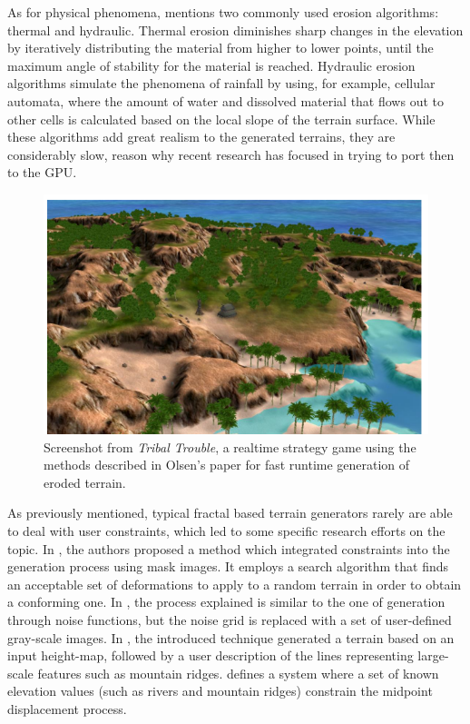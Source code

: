 \documentclass{acmtog}
\begin{document}
As for physical phenomena, \cite{Olsen04} mentions two commonly used erosion algorithms: thermal and hydraulic. Thermal erosion diminishes sharp changes in the elevation by iteratively distributing the material from higher to lower points, until the maximum angle of stability for the material is reached. Hydraulic erosion algorithms simulate the phenomena of rainfall by using, for example, cellular automata, where the amount of water and dissolved material that flows out to other cells is calculated based on the local slope of the terrain surface. While these algorithms add great realism to the generated terrains, they are considerably slow, reason why recent research has focused in trying to port then to the GPU.

\begin{figure}[!htp]
	\begin{center}
		\includegraphics[width=\columnwidth]{images/erosion.png}
	\end{center}
	\caption{Screenshot from \textit{Tribal Trouble}, a realtime strategy game using the methods described in Olsen's paper for fast runtime generation of eroded terrain.}
\end{figure}

As previously mentioned, typical fractal based terrain generators rarely are able to deal with user constraints, which led to some specific research efforts on the topic. In \cite{Stachniak05}, the authors proposed a method which integrated constraints into the generation process using mask images. It employs a search algorithm that finds an acceptable set of deformations to apply to a random terrain in order to obtain a conforming one. In \cite{Schneider06}, the process explained is similar to the one of generation through noise functions, but the noise grid is replaced with a set of user-defined gray-scale images. In \cite{Zhou07}, the introduced technique generated a terrain based on an input height-map, followed by a user description of the lines representing large-scale features such as mountain ridges. \cite{Belhadj07} defines a system where a set of known elevation values (such as rivers and mountain ridges) constrain the midpoint displacement process.
\end{document}
